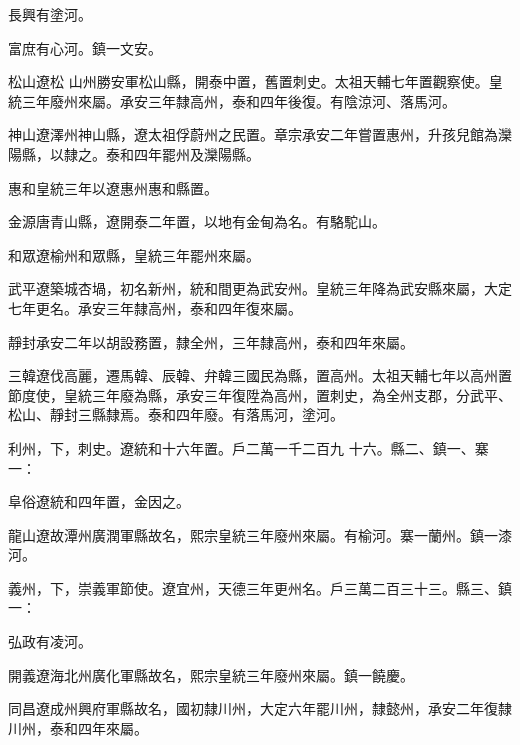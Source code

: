 \begin{pinyinscope}
 長興有塗河。



 富庶有心河。鎮一文安。



 松山遼松
 山州勝安軍松山縣，開泰中置，舊置刺史。太祖天輔七年置觀察使。皇統三年廢州來屬。承安三年隸高州，泰和四年後復。有陰涼河、落馬河。



 神山遼澤州神山縣，遼太祖俘蔚州之民置。章宗承安二年嘗置惠州，升孩兒館為灤陽縣，以隸之。泰和四年罷州及灤陽縣。



 惠和皇統三年以遼惠州惠和縣置。



 金源唐青山縣，遼開泰二年置，以地有金甸為名。有駱駝山。



 和眾遼榆州和眾縣，皇統三年罷州來屬。



 武平遼築城杏堝，初名新州，統和間更為武安州。皇統三年降為武安縣來屬，大定七年更名。承安三年隸高州，泰和四年復來屬。



 靜封承安二年以胡設務置，隸全州，三年隸高州，泰和四年來屬。



 三韓遼伐高麗，遷馬韓、辰韓、弁韓三國民為縣，置高州。太祖天輔七年以高州置節度使，皇統三年廢為縣，承安三年復陞為高州，置刺史，為全州支郡，分武平、松山、靜封三縣隸焉。泰和四年廢。有落馬河，塗河。



 利州，下，刺史。遼統和十六年置。戶二萬一千二百九
 十六。縣二、鎮一、寨一：



 阜俗遼統和四年置，金因之。



 龍山遼故潭州廣潤軍縣故名，熙宗皇統三年廢州來屬。有榆河。寨一蘭州。鎮一漆河。



 義州，下，崇義軍節使。遼宜州，天德三年更州名。戶三萬二百三十三。縣三、鎮一：



 弘政有凌河。



 開義遼海北州廣化軍縣故名，熙宗皇統三年廢州來屬。鎮一饒慶。



 同昌遼成州興府軍縣故名，國初隸川州，大定六年罷川州，隸懿州，承安二年復隸川州，泰和四年來屬。




\end{pinyinscope}
